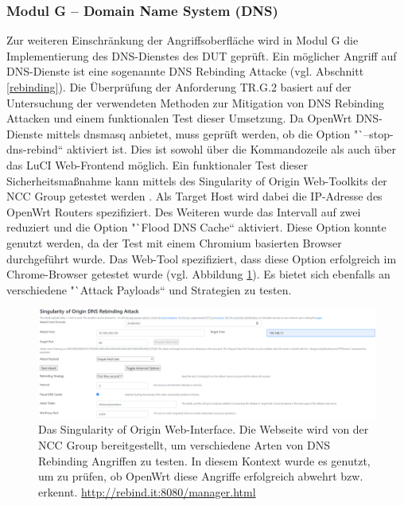\documentclass[a4paper]{book}
\begin{document}
\begin{large}
\subsubsection{Modul G – Domain Name System (DNS)}
\begin{onehalfspace}
Zur weiteren Einschränkung der Angriffsoberfläche wird in Modul G die Implementierung des DNS-Dienstes des DUT geprüft. Ein möglicher Angriff auf DNS-Dienste ist eine sogenannte DNS Rebinding Attacke (vgl. Abschnitt \ref{rebinding}). Die Überprüfung der Anforderung TR.G.2 basiert auf der Untersuchung der verwendeten Methoden zur Mitigation von DNS Rebinding Attacken und einem funktionalen Test dieser Umsetzung. Da OpenWrt DNS-Dienste mittels dnsmasq anbietet, muss geprüft werden, ob die Option "`--stop-dns-rebind“ aktiviert ist. Dies ist sowohl über die Kommandozeile als auch über das LuCI Web-Frontend möglich. Ein funktionaler Test dieser Sicherheitsmaßnahme kann mittels des Singularity of Origin Web-Toolkits der NCC Group getestet werden \cite{GeraldDoussot.2019}. Als Target Host wird dabei die IP-Adresse des OpenWrt Routers spezifiziert. Des Weiteren wurde das Intervall auf zwei reduziert und die Option "`Flood DNS Cache“ aktiviert. Diese Option konnte genutzt werden, da der Test mit einem Chromium basierten Browser durchgeführt wurde. Das Web-Tool spezifiziert, dass diese Option erfolgreich im Chrome-Browser getestet wurde (vgl. Abbildung \ref{fig:Singularity Web Interface}). Es bietet sich ebenfalls an verschiedene "`Attack Payloads“ und Strategien zu testen. \\

\begin{figure}[ht]
\begin{center}
\includegraphics[scale=0.3]{images/Singularity_web} 
\caption{Das Singularity of Origin Web-Interface. Die Webseite wird von der NCC Group bereitgestellt, um verschiedene Arten von DNS Rebinding Angriffen zu testen. In diesem Kontext wurde es genutzt, um zu prüfen, ob OpenWrt diese Angriffe erfolgreich abwehrt bzw. erkennt. \protect\url{http://rebind.it:8080/manager.html}}
\label{fig:Singularity Web Interface}
\end{center}
\end{figure}




\end{onehalfspace}
\end{large}
\end{document}
